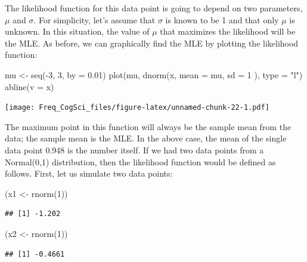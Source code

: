 \documentclass[
  12pt,
]{krantz}
\newenvironment{Shaded}{\begin{snugshade}}{\end{snugshade}}
\newcommand{\AttributeTok}[1]{\textcolor[rgb]{0.77,0.63,0.00}{#1}}
\newcommand{\DecValTok}[1]{\textcolor[rgb]{0.00,0.00,0.81}{#1}}
\newcommand{\FloatTok}[1]{\textcolor[rgb]{0.00,0.00,0.81}{#1}}
\newcommand{\FunctionTok}[1]{\textcolor[rgb]{0.00,0.00,0.00}{#1}}
\newcommand{\NormalTok}[1]{#1}
\newcommand{\OtherTok}[1]{\textcolor[rgb]{0.56,0.35,0.01}{#1}}
\newcommand{\SpecialCharTok}[1]{\textcolor[rgb]{0.00,0.00,0.00}{#1}}
\newcommand{\StringTok}[1]{\textcolor[rgb]{0.31,0.60,0.02}{#1}}
\theoremstyle{definition}
\theoremstyle{definition}
\theoremstyle{definition}
\theoremstyle{definition}
\theoremstyle{remark}
\begin{document}
The likelihood function for this data point is going to depend on two parameters, \(\mu\) and \(\sigma\). For simplicity, let's assume that \(\sigma\) is known to be 1 and that only \(\mu\) is unknown. In this situation, the value of \(\mu\) that maximizes the likelihood will be the MLE. As before, we can graphically find the MLE by plotting the likelihood function:

\begin{Shaded}
\begin{Highlighting}[]
\NormalTok{mu }\OtherTok{\textless{}{-}} \FunctionTok{seq}\NormalTok{(}\SpecialCharTok{{-}}\DecValTok{3}\NormalTok{, }\DecValTok{3}\NormalTok{, }\AttributeTok{by =} \FloatTok{0.01}\NormalTok{)}
\FunctionTok{plot}\NormalTok{(mu, }\FunctionTok{dnorm}\NormalTok{(x,}
  \AttributeTok{mean =}\NormalTok{ mu,}
  \AttributeTok{sd =} \DecValTok{1}
\NormalTok{), }\AttributeTok{type =} \StringTok{"l"}\NormalTok{)}
\FunctionTok{abline}\NormalTok{(}\AttributeTok{v =}\NormalTok{ x)}
\end{Highlighting}
\end{Shaded}

\texttt{[image: Freq\_CogSci\_files/figure-latex/unnamed-chunk-22-1.pdf]}

The maximum point in this function will always be the sample mean from the data; the sample mean is the MLE. In the above case, the mean of the single data point 0.948 is the number itself. If we had two data points from a Normal(0,1) distribution, then the likelihood function would be defined as follows. First, let us simulate two data points:

\begin{Shaded}
\begin{Highlighting}[]
\NormalTok{(x1 }\OtherTok{\textless{}{-}} \FunctionTok{rnorm}\NormalTok{(}\DecValTok{1}\NormalTok{))}
\end{Highlighting}
\end{Shaded}

\begin{verbatim}
## [1] -1.202
\end{verbatim}

\begin{Shaded}
\begin{Highlighting}[]
\NormalTok{(x2 }\OtherTok{\textless{}{-}} \FunctionTok{rnorm}\NormalTok{(}\DecValTok{1}\NormalTok{))}
\end{Highlighting}
\end{Shaded}

\begin{verbatim}
## [1] -0.4661
\end{verbatim}
\end{document}
